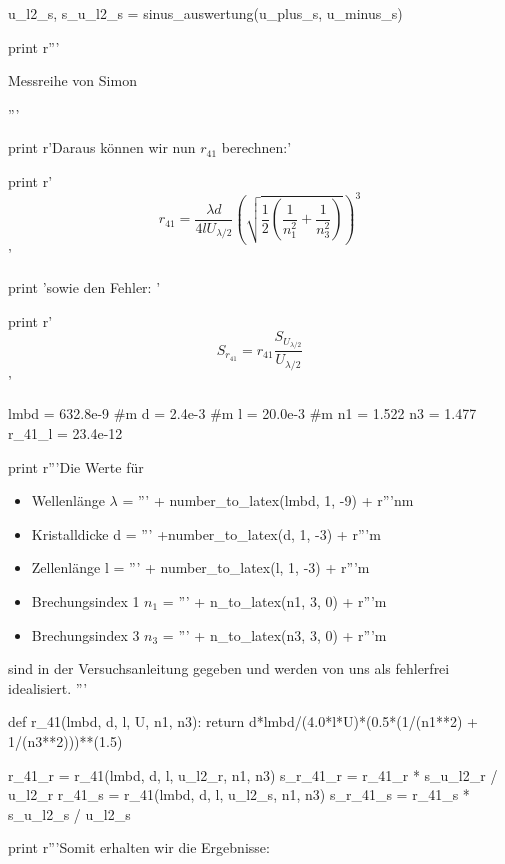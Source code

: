 \begin{python}
\begin{table}[H]
\begin{minipage}[b]{0.5\linewidth}
u_l2_s, s_u_l2_s = sinus_auswertung(u_plus_s, u_minus_s)


print r'''\caption{Messreihe von Simon}
	  \end{minipage}
          \end{table} '''

print r'Daraus k\"onnen wir nun $r_{41}$ berechnen:'

print r'$$ r_{41} = \frac{\lambda d}{4l U_{\lambda / 2}} \left(  \sqrt{\frac{1}{2} \left( \frac{1}{n_1^2} + \frac{1}{n_3^2} \right)} \right)^3 $$'

print 'sowie den Fehler: '

print r'$$S_{r_{41}} = r_{41} \frac{S_{U_{\lambda/2}}}{U_{\lambda/2}} $$'

lmbd = 632.8e-9 #m
d = 2.4e-3 #m
l = 20.0e-3 #m
n1 = 1.522
n3 = 1.477
r_41_l = 23.4e-12

print r'''Die Werte f\"ur\\
\begin{itemize}
 \item Wellenl\"ange $\lambda$ = ''' + number_to_latex(lmbd, 1, -9) + r'''nm \\
 \item Kristalldicke d = ''' +number_to_latex(d, 1, -3) + r'''m\\
 \item Zellenl\"ange l = ''' + number_to_latex(l, 1, -3) + r'''m\\
 \item Brechungsindex 1 $n_1$ = ''' + n_to_latex(n1, 3, 0) + r'''m\\
 \item Brechungsindex 3 $n_3$ = ''' + n_to_latex(n3, 3, 0) + r'''m\\
\end{itemize}
sind in der Versuchsanleitung gegeben und werden von uns als fehlerfrei idealisiert.
'''

def r_41(lmbd, d, l, U, n1, n3):
  return d*lmbd/(4.0*l*U)*(0.5*(1/(n1**2) + 1/(n3**2)))**(1.5)

r_41_r = r_41(lmbd, d, l, u_l2_r, n1, n3)
s_r_41_r = r_41_r * s_u_l2_r / u_l2_r
r_41_s = r_41(lmbd, d, l, u_l2_s, n1, n3)
s_r_41_s = r_41_s * s_u_l2_s / u_l2_s

print r'''Somit erhalten wir die Ergebnisse:\\
\begin{center}
\end{center}
\end{python}
